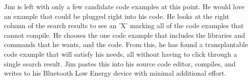 Jim is left with only a few candidate code examples at this point.
He would love an example that could be plugged right into his code.
He looks at the right column of the search results to see an 'X' marking all of the code examples that cannot compile.
He chooses the one code example that includes the libraries and commands that he wants, and the code.
From this, he has found a transplantable code example that will satisfy his needs, all without having to click through a single search result.
Jim pastes this into his source code editor, compiles, and writes to his Bluetooth Low Energy device with minimal additional effort.